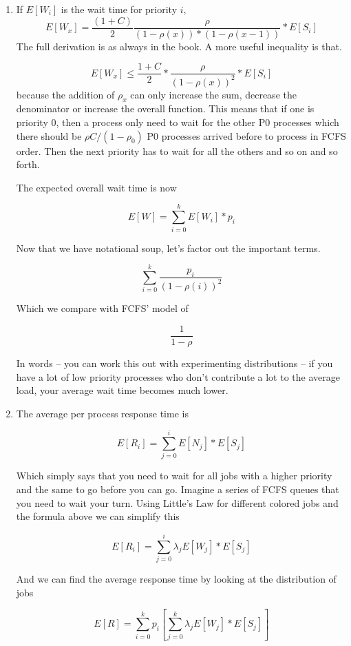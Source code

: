 \begin{enumerate}
\item If $E[W_i]$ is the wait time for priority $i$,
  \[
  E[W_x] = \frac{(1 + C)}{2}\frac{\rho}{(1 - \rho(x))*( 1 - \rho(x-1))} * E[S_i]
  \]
    The full derivation is as always in the book.
    A more useful inequality is that.

    \[
    E[W_x] \leq \frac{1 + C}{2}* \frac{\rho}{(1 - \rho(x))^2} * E[S_i]
    \]
    because the addition of $\rho_x$ can only increase the sum, decrease the denominator or increase the overall function.
  This means that if one is priority 0, then a process only need to wait for the other P0 processes which there should be $\rho C/ (1 - \rho_0)$ P0 processes arrived before to process in FCFS order.
  Then the next priority has to wait for all the others and so on and so forth.

  The expected overall wait time is now

  \[
      E[W] = \sum\limits_{i=0}^k E[W_i] * p_i
  \]

  Now that we have notational soup, let's factor out the important terms.

  \[
      \sum\limits_{i=0}^k \frac{p_i}{(1-\rho(i))^2}
  \]

  Which we compare with FCFS' model of

  \[
      \frac{1}{1-\rho}
  \]

  In words -- you can work this out with experimenting distributions -- if you have a lot of low priority processes who don't contribute a lot to the average load, your average wait time becomes much lower.

\item The average per process response time is

  \[
  E[R_i] = \sum\limits_{j = 0}^i E[N_j] * E[S_j]
  \]

  Which simply says that you need to wait for all jobs with a higher priority and the same to go before you can go.
  Imagine a series of FCFS queues that you need to wait your turn.
  Using Little's Law for different colored jobs and the formula above we can simplify this

  \[
      E[R_i] = \sum\limits_{j=0}^i \lambda_j E[W_j] * E[S_j]
  \]

  And we can find the average response time by looking at the distribution of jobs

  \[
      E[R] = \sum\limits_{i=0}^k p_i [\sum\limits_{j=0}^k \lambda_j E[W_j] * E[S_j] ]
  \]


\end{enumerate}
